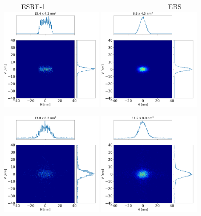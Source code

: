 \documentclass{iucr}              %
\begin{document}
\begin{figure}
\label{fig:ray tracing}
\centering
~~~~~ESRF-1~~~~~~~~~~~~~~~~~~~~~~~~~~~~~~~~~~~EBS
\newline
\includegraphics[width=0.45\textwidth]{GRAPHICS/idealelementsESRF.png}
\includegraphics[width=0.45\textwidth]{GRAPHICS/idealelementsEBS.png}

\includegraphics[width=0.45\textwidth]{GRAPHICS/hybridnoerrorsESRF.png}
\includegraphics[width=0.45\textwidth]{GRAPHICS/hybridnoerrorsEBS.png}


\end{figure}
\end{document}
